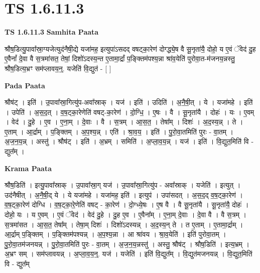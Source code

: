 \documentclass[17pt]{extarticle}
\begin{document}
\section*{ TS 1.6.11.3 }

\textbf{TS 1.6.11.3 } \newline
\textbf{Samhita Paata} \newline

श्रौष॒डित्यु॒पावा᳚स्रा॒ग्यजेत्युद॑नैषी॒द्ये यजा॑मह॒ इत्युपा॑ऽसदद् वषट्का॒रेण॑ दोग्द्ध्ये॒ष वै सू॒नृता॑यै॒ दोहो॒ य ए॒वं ॅवेद॑ दु॒ह ए॒वैनां᳚ दे॒वा वै स॒त्रमा॑सत॒ तेषां॒ दिशो॑ऽदस्य॒न्त ए॒तामा॒र्द्रां प॒ङ्क्तिम॑पश्य॒न्ना श्रा॑व॒येति॑ पुरोवा॒त-म॑जनय॒न्नस्तु॒ श्रौष॒डित्य॒भ्रꣳ सम॑प्लावय॒न्॒. यजेति॑ वि॒द्युत॑ - [ ] \newline

\textbf{Pada Paata} \newline

श्रौष॑ट् । इति॑ । उ॒पावा᳚स्रा॒गित्यु॑प-अवा᳚स्राक् । यज॑ । इति॑ । उदिति॑ । अ॒नै॒षी॒त् । ये । यजा॑महे । इति॑ । उपेति॑ । अ॒स॒द॒त् । व॒ष॒ट्का॒रेणेति॑ वषट्-का॒रेण॑ । दो॒ग्धि॒ । ए॒षः । वै । सू॒नृता॑यै । दोहः॑ । यः । ए॒वम् । वेद॑ । दु॒हे । ए॒व । ए॒ना॒म् । दे॒वाः । वै । स॒त्रम् । आ॒स॒त॒ । तेषा᳚म् । दिशः॑ । अ॒द॒स्य॒न्न् । ते । ए॒ताम् । आ॒र्द्राम् । प॒ङ्क्तिम् । अ॒प॒श्य॒न्न् । एति॑ । श्रा॒व॒य॒ । इति॑ । पु॒रो॒वा॒तमिति॑ पुरः - वा॒तम् । अ॒ज॒न॒य॒न्न् । अस्तु॑ । श्रौष॑ट् । इति॑ । अ॒भ्रम् । समिति॑ । अ॒प्ला॒व॒य॒न्न् । यज॑ । इति॑ । वि॒द्युत॒मिति॑ वि - द्युत᳚म् ।  \newline


\textbf{Krama Paata} \newline

श्रौष॒डिति॑ । इत्यु॒पावा᳚स्राक् । उ॒पावा᳚स्रा॒ग् यज॑ । उ॒पावा᳚स्रा॒गित्यु॑प - अवा᳚स्राक् । यजेति॑ । इत्युत् । उद॑नैषीत् । अ॒नै॒षी॒द् ये । ये यजा॑महे । यजा॑मह॒ इति॑ । इत्युप॑ । उपा॑सदत् । अ॒स॒द॒द् व॒ष॒ट्का॒रेण॑ । व॒ष॒ट्का॒रेण॑ दोग्धि । व॒ष॒ट्का॒रे॒णेति॑ वषट् - का॒रेण॑ । दो॒ग्ध्ये॒षः । ए॒ष वै । वै सू॒नृता॑यै । सू॒नृता॑यै॒ दोहः॑ । दोहो॒ यः । य ए॒वम् । ए॒वं ॅवेद॑ । वेद॑ दु॒हे । दु॒ह ए॒व । ए॒वैना᳚म् । ए॒ना॒म् दे॒वाः । दे॒वा वै । वै स॒त्रम् । स॒त्रमा॑सत । आ॒स॒त॒ तेषा᳚म् । तेषा॒म् दिशः॑ । दिशो॑ऽदस्यन्न् । अ॒द॒स्य॒न् ते । त ए॒ताम् । ए॒तामा॒र्द्राम् । आ॒र्द्राम् प॒ङ्क्तिम् । प॒ङ्क्तिम॑पश्यन्न् । अ॒प॒श्य॒न्ना । आ श्रा॑वय । श्रा॒व॒येति॑ । इति॑ पुरोवा॒तम् । पु॒रो॒वा॒तम॑जनयन्न् । पु॒रो॒वा॒तमिति॑ पुरः - वा॒तम् । अ॒ज॒न॒य॒न्नस्तु॑ । अस्तु॒ श्रौष॑ट् । श्रौष॒डिति॑ । इत्य॒भ्रम् । अ॒भ्रꣳ सम् । सम॑प्लावयन्न् । अ॒प्ला॒व॒य॒न्॒. यज॑ । यजेति॑ । इति॑ वि॒द्युत᳚म् । वि॒द्युत॑मजनयन्न् । वि॒द्युत॒मिति॑ वि - द्युत᳚म् \newline
\end{document}
